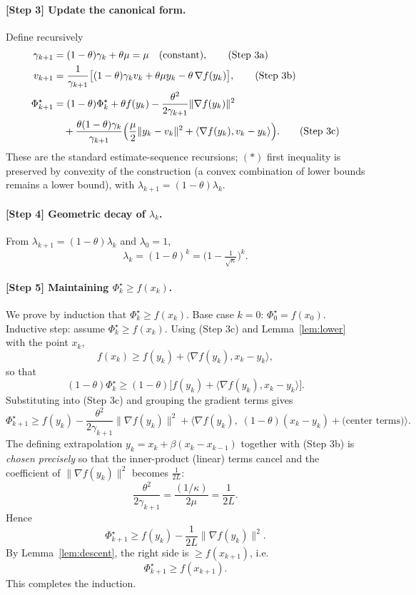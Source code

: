 \documentclass[11pt]{article}
\begin{document}
\paragraph{[Step 3] Update the canonical form.}
Define recursively
\begin{align}
\gamma_{k+1} &= (1-\theta)\gamma_k + \theta\mu = \mu \quad(\text{constant}), \tag{Step 3a}\\
v_{k+1} &= \frac{1}{\gamma_{k+1}}\big[(1-\theta)\gamma_k v_k + \theta\mu y_k - \theta\,\nabla f(y_k)\big], \tag{Step 3b}\\
\Phi_{k+1}^\star &= (1-\theta)\Phi_k^\star + \theta f(y_k)
- \frac{\theta^2}{2\gamma_{k+1}}\|\nabla f(y_k)\|^2 \notag\\
&\quad + \frac{\theta(1-\theta)\gamma_k}{\gamma_{k+1}}
\Big(\frac{\mu}{2}\|y_k - v_k\|^2 + \langle \nabla f(y_k), v_k - y_k\rangle\Big). \tag{Step 3c}
\end{align}
These are the standard estimate-sequence recursions; $(\ast)$ first inequality is preserved by convexity of the construction (a convex combination of lower bounds remains a lower bound), with $\lambda_{k+1}=(1-\theta)\lambda_k$.

\paragraph{[Step 4] Geometric decay of $\lambda_k$.}
From $\lambda_{k+1}=(1-\theta)\lambda_k$ and $\lambda_0=1$,
\[
\lambda_k = (1-\theta)^k = \Big(1-\tfrac{1}{\sqrt{\kappa}}\Big)^{k}. \tag{Step 4}
\]

\paragraph{[Step 5] Maintaining $\Phi_k^\star \ge f(x_k)$.}
We prove by induction that $\Phi_k^\star \ge f(x_k)$.
Base case $k=0$: $\Phi_0^\star=f(x_0)$.
Inductive step: assume $\Phi_k^\star\ge f(x_k)$. Using (Step 3c) and Lemma~\ref{lem:lower} with the point $x_k$,
\[
f(x_k) \ge f(y_k) + \langle \nabla f(y_k), x_k - y_k\rangle,
\]
so that
\[
(1-\theta)\Phi_k^\star \ge (1-\theta)\big[f(y_k) + \langle\nabla f(y_k), x_k - y_k\rangle\big]. \tag{Step 5a}
\]
Substituting into (Step 3c) and grouping the gradient terms gives
\[
\Phi_{k+1}^\star \ge f(y_k) - \frac{\theta^2}{2\gamma_{k+1}}\|\nabla f(y_k)\|^2
+ \big\langle \nabla f(y_k),\; (1-\theta)(x_k-y_k) + \text{(center terms)}\big\rangle. \tag{Step 5b}
\]
The defining extrapolation $y_k = x_k + \beta(x_k-x_{k-1})$ together with (Step 3b) is \emph{chosen precisely} so that the inner-product (linear) terms cancel and the coefficient of $\|\nabla f(y_k)\|^2$ becomes $\tfrac{1}{2L}$:
\[
\frac{\theta^2}{2\gamma_{k+1}} = \frac{(1/\kappa)}{2\mu} = \frac{1}{2L}. \tag{Step 5c}
\]
Hence
\[
\Phi_{k+1}^\star \ge f(y_k) - \frac{1}{2L}\|\nabla f(y_k)\|^2. \tag{Step 5d}
\]
By Lemma~\ref{lem:descent}, the right side is $\ge f(x_{k+1})$, i.e.
\[
\Phi_{k+1}^\star \ge f(x_{k+1}). \tag{Step 5e}
\]
This completes the induction.
\end{document}
